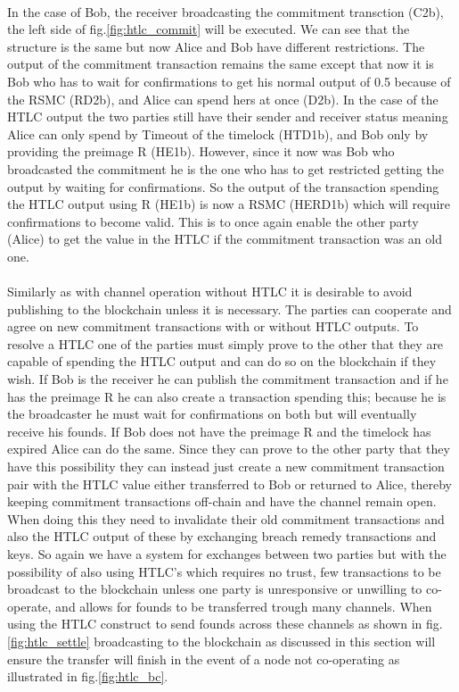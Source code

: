 \paragraph{}
In the case of Bob, the receiver broadcasting the commitment transction (C2b), the left side of fig.\ref{fig:htlc_commit} will be executed. We can see that the structure is the same but now Alice and Bob have different restrictions. The output of the commitment transaction remains the same except that now it is Bob who has to wait for confirmations to get his normal output of 0.5 because of the RSMC (RD2b), and Alice can spend hers at once (D2b). In the case of the HTLC output the two parties still have their sender and receiver status meaning Alice can only spend by Timeout of the timelock (HTD1b), and Bob only by providing the preimage R (HE1b). However, since it now was Bob who broadcasted the commitment he is the one who has to get restricted getting the output by waiting for confirmations. So the output of the transaction spending the HTLC output using R (HE1b) is now a RSMC (HERD1b) which will require confirmations to become valid. This is to once again enable the other party (Alice) to get the value in the HTLC if the commitment transaction was an old one.  

\paragraph{}
Similarly as with channel operation without HTLC it is desirable to avoid publishing to the blockchain unless it is necessary. The parties can cooperate and agree on new commitment transactions with or without HTLC outputs. To resolve a HTLC one of the parties must simply prove to the other that they are capable of spending the HTLC output and can do so on the blockchain if they wish. If Bob is the receiver he can publish the commitment transaction and if he has the preimage R he can also create a transaction spending this; because he is the broadcaster he must wait for confirmations on both but will eventually receive his founds. If Bob does not have the preimage R and the timelock has expired Alice can do the same. Since they can prove to the other party that they have this possibility they can instead just create a new commitment transaction pair with the HTLC value either transferred to Bob or returned to Alice, thereby keeping  commitment transactions off-chain and have the channel remain open. When doing this they need to invalidate their old commitment transactions and also the HTLC output of these by exchanging breach remedy transactions and keys. So again we have a system for exchanges between two parties but with the possibility of also using HTLC's which requires no trust, few transactions to be broadcast to the blockchain unless one party is unresponsive or unwilling to co-operate, and allows for founds to be transferred trough many channels.  
When using the HTLC construct to send founds across these channels as shown in fig.\ref{fig:htlc_settle} broadcasting to the blockchain as discussed in this section will ensure the transfer will finish in the event of a node not co-operating as illustrated in fig.\ref{fig:htlc_bc}.

